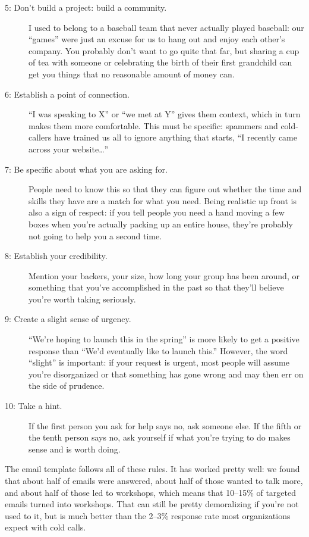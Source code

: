 \begin{description}
\item[5: Don't build a project: build a community.]
  I used to belong to a baseball team that never actually played baseball:
  our ``games'' were just an excuse for us to hang out and enjoy each other's company.
  You probably don't want to go quite that far,
  but sharing a cup of tea with someone or celebrating the birth of their first grandchild
  can get you things that no reasonable amount of money can.

\item[6: Establish a point of connection.]
  ``I was speaking to X'' or ``we met at Y'' gives them context,
  which in turn makes them more comfortable.
  This must be specific:
  spammers and cold-callers have trained us all to ignore anything that starts,
  ``I recently came across your website{\ldots}''

\item[7: Be specific about what you are asking for.]
  People need to know this
  so that they can figure out whether the time and skills they have
  are a match for what you need.
  Being realistic up front is also a sign of respect:
  if you tell people you need a hand moving a few boxes
  when you're actually packing up an entire house,
  they're probably not going to help you a second time.

\item[8: Establish your credibility.]
  Mention your backers,
  your size,
  how long your group has been around, or something that you've accomplished in the past
  so that they'll believe you're worth taking seriously.

\item[9: Create a slight sense of urgency.]
  ``We're hoping to launch this in the spring'' is more likely to get a positive response
  than ``We'd eventually like to launch this.''
  However, the word ``slight'' is important:
  if your request is urgent,
  most people will assume you're disorganized or that something has gone wrong
  and may then err on the side of prudence.

\item[10: Take a hint.]
  If the first person you ask for help says no,
  ask someone else.
  If the fifth or the tenth person says no,
  ask yourself if what you're trying to do makes sense and is worth doing.

\end{description}

The email template follows all of these rules.
It has worked pretty well:
we found that about half of emails were answered,
about half of those wanted to talk more,
and about half of those led to workshops,
which means that 10--15\% of targeted emails turned into workshops.
That can still be pretty demoralizing if you're not used to it,
but is much better than the 2--3\% response rate most organizations expect with cold calls.

